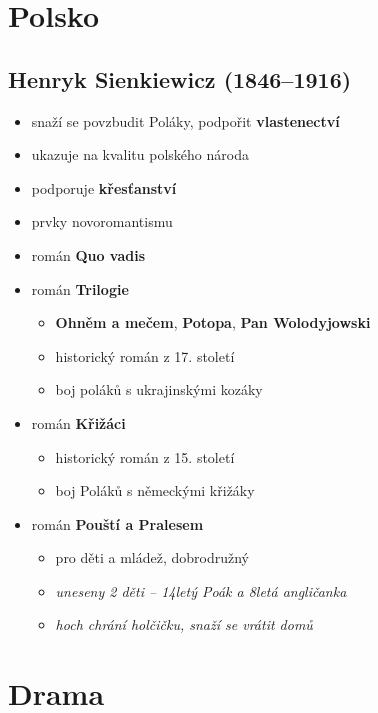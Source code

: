 \section{Polsko}
\subsection{Henryk Sienkiewicz (1846--1916)}
\begin{itemize}
\item snaží se povzbudit Poláky, podpořit \textbf{vlastenectví}
\item ukazuje na kvalitu polského národa
\item podporuje \textbf{křesťanství}
\item prvky novoromantismu
\item román \textbf{Quo vadis}
\item román \textbf{Trilogie}
	\begin{itemize}
	\item \textbf{Ohněm a mečem}, \textbf{Potopa}, \textbf{Pan Wolodyjowski}
	\item historický román z 17. století
	\item boj poláků s ukrajinskými kozáky
	\end{itemize}
\item román \textbf{Křižáci}
	\begin{itemize}
	\item historický román z 15. století
	\item boj Poláků s německými křižáky
	\end{itemize}
\item román \textbf{Pouští a Pralesem}
	\begin{itemize}
	\item pro děti a mládež, dobrodružný
	\item \textit{uneseny 2 děti -- 14letý Poák a 8letá angličanka}
	\item \textit{hoch chrání holčičku, snaží se vrátit domů}
	\end{itemize}
\end{itemize}

\section{Drama}
